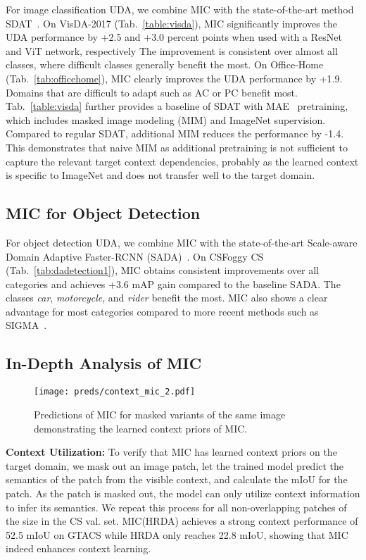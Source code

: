 \documentclass[10pt,twocolumn,letterpaper]{article}
\begin{document}
For image classification UDA, we combine MIC with the state-of-the-art method SDAT~\cite{rangwani2022closer}. On VisDA-2017 (Tab.~\ref{table:visda}), MIC significantly improves the UDA performance by +2.5 and +3.0 percent points when used with a ResNet and ViT network, respectively The improvement is consistent over almost all classes, where difficult classes generally benefit the most. On Office-Home (Tab.~\ref{tab:officehome}), MIC clearly improves the UDA performance by +1.9. Domains that are difficult to adapt such as AC or PC benefit most.
Tab.~\ref{table:visda} further provides a baseline of SDAT with MAE~\cite{he2022masked} pretraining, which includes masked image modeling (MIM) and ImageNet supervision. Compared to regular SDAT, additional MIM reduces the performance by -1.4. This demonstrates that naive MIM as additional pretraining is not sufficient to capture the relevant target context dependencies, probably as the learned context is specific to ImageNet and does not transfer well to the target domain.

\subsection{MIC for Object Detection}
For object detection UDA, we combine MIC with the state-of-the-art Scale-aware Domain Adaptive Faster-RCNN (SADA)~\cite{chen2021scale}.
On CSFoggy CS (Tab.~\ref{tab:dadetection1}), MIC obtains consistent improvements over all categories and achieves +3.6 mAP gain compared to the baseline SADA. The classes \emph{car}, \emph{motorcycle}, and \emph{rider} benefit the most. 
MIC also shows a clear advantage for most categories compared to more recent methods such as SIGMA~\cite{li2022sigma}.

\subsection{In-Depth Analysis of MIC}
\label{sec:exp_study}

\begin{figure}
    \centering
    \texttt{[image: preds/context\_mic\_2.pdf]}
    \caption{Predictions of MIC for masked variants of the same image demonstrating the learned context priors of MIC.
    }
    \label{fig:mic_context}
\end{figure}

\noindent\textbf{Context Utilization:}
To verify that MIC has learned context priors on the target domain, we mask out an image patch, let the trained model predict the semantics of the patch from the visible context, and calculate the mIoU for the patch. As the patch is masked out, 
the model can only utilize context information to infer its semantics. We repeat this process for all non-overlapping patches of the size  in the CS val. set. MIC(HRDA) achieves a strong context performance of 52.5 mIoU on GTACS while HRDA only reaches 22.8 mIoU, showing that MIC indeed enhances context learning.
\end{document}
